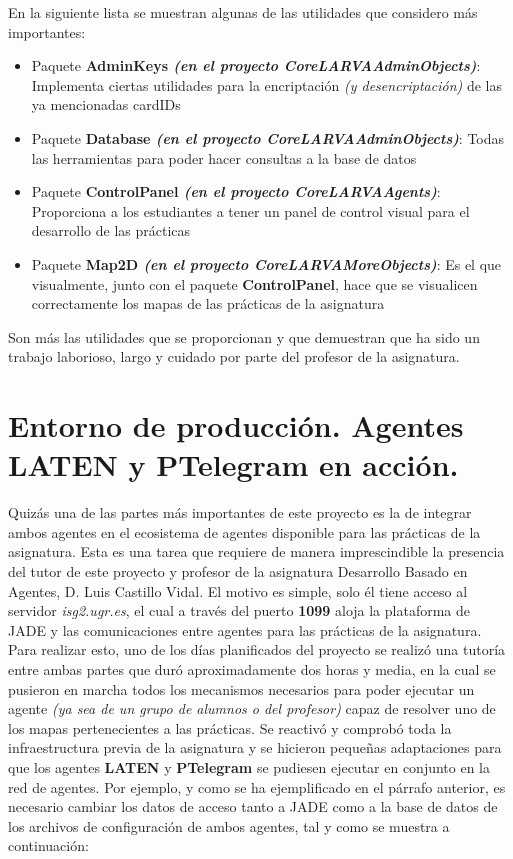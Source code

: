 En la siguiente lista se muestran algunas de las utilidades que considero más importantes:

\begin{itemize}
	\item Paquete \textbf{AdminKeys \textit{(en el proyecto CoreLARVAAdminObjects)}}: Implementa ciertas utilidades para la encriptación \textit{(y desencriptación)} de las ya mencionadas cardIDs
	\item Paquete \textbf{Database \textit{(en el proyecto CoreLARVAAdminObjects)}}: Todas las herramientas para poder hacer consultas a la base de datos
	\item Paquete \textbf{ControlPanel \textit{(en el proyecto CoreLARVAAgents)}}: Proporciona a los estudiantes a tener un panel de control visual para el desarrollo de las prácticas
	\item Paquete \textbf{Map2D \textit{(en el proyecto CoreLARVAMoreObjects)}}: Es el que visualmente, junto con el paquete \textbf{ControlPanel}, hace que se visualicen correctamente los mapas de las prácticas de la asignatura
\end{itemize}

Son más las utilidades que se proporcionan y que demuestran que ha sido un trabajo laborioso, largo y cuidado por parte del profesor de la asignatura.

\section{Entorno de producción. Agentes LATEN y PTelegram en acción.}

Quizás una de las partes más importantes de este proyecto es la de integrar ambos agentes en el ecosistema de agentes disponible para las prácticas de la asignatura. Esta es una tarea que requiere de manera imprescindible la presencia del tutor de este proyecto y profesor de la asignatura Desarrollo Basado en Agentes, D. Luis Castillo Vidal. El motivo es simple, solo él tiene acceso al servidor \textit{isg2.ugr.es}, el cual a través del puerto \textbf{1099} aloja la plataforma de JADE y las comunicaciones entre agentes para las prácticas de la asignatura.\\

Para realizar esto, uno de los días planificados del proyecto se realizó una tutoría entre ambas partes que duró aproximadamente dos horas y media, en la cual se pusieron en marcha todos los mecanismos necesarios para poder ejecutar un agente \textit{(ya sea de un grupo de alumnos o del profesor)} capaz de resolver uno de los mapas pertenecientes a las prácticas. Se reactivó y comprobó toda la infraestructura previa de la asignatura y se hicieron pequeñas adaptaciones para que los agentes \textbf{LATEN} y \textbf{PTelegram} se pudiesen ejecutar en conjunto en la red de agentes. Por ejemplo, y como se ha ejemplificado en el párrafo anterior, es necesario cambiar los datos de acceso tanto a JADE como a la base de datos de los archivos de configuración de ambos agentes, tal y como se muestra a continuación:\\

